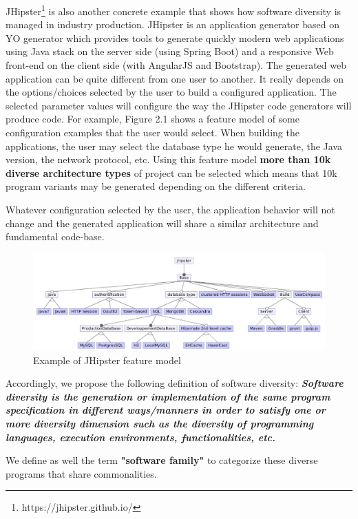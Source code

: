 JHipster\footnote{https://jhipster.github.io/} is also another concrete example that shows how software diversity is managed in industry production. JHipster is an application generator based on YO generator which provides tools to generate quickly modern web applications using Java stack on the server side (using Spring Boot) and a responsive Web front-end on the client side (with AngularJS and Bootstrap).
The generated web application can be quite different from one user to another. It really depends on the options/choices selected by the user to build a configured application. The selected parameter values will configure the way the JHipster code generators will produce code. 
For example, Figure 2.1 shows a feature model of some configuration examples that the user would select. When building the applications, the user may select the database type he would generate, the Java version, the network protocol, etc. 
Using this feature model \textbf{more than 10k diverse architecture types} of project can be selected which means that 10k program variants may be generated depending on the different criteria.

Whatever configuration selected by the user, the application behavior will not change and the generated application will share a similar architecture and fundamental code-base.
\begin{figure}[h]
	\center
	\includegraphics[scale=0.65]{Background/fig/jhipster}
	\caption{Example of JHipster feature model}
\end{figure}



Accordingly, we propose the following definition of software diversity: 
\textit{\textbf{Software diversity is the generation or implementation of the same program specification in different ways/manners in order to satisfy one or more diversity dimension such as the diversity of programming languages, execution environments, functionalities, etc. }}
		
We define as well the term \textbf{"software family"} to categorize these diverse programs that share commonalities. 

